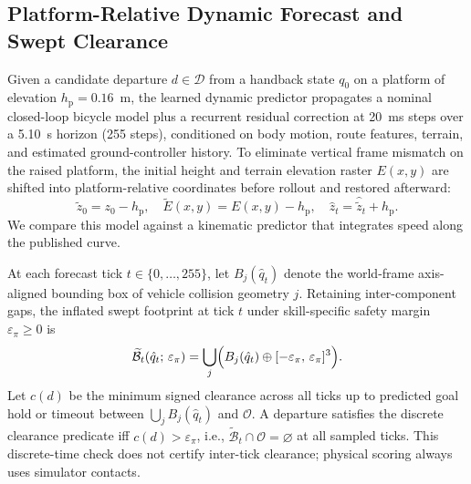\documentclass[letterpaper,10pt,conference]{ieeeconf}
\begin{document}
\subsection{Platform-Relative Dynamic Forecast and Swept Clearance}
Given a candidate departure $d\in\mathcal{D}$ from a handback state $q_0$ on a platform of elevation $h_{\mathrm{p}}=0.16$~m, the learned dynamic predictor propagates a nominal closed-loop bicycle model plus a recurrent residual correction at 20~ms steps over a 5.10~s horizon (255 steps), conditioned on body motion, route features, terrain, and estimated ground-controller history. To eliminate vertical frame mismatch on the raised platform, the initial height and terrain elevation raster $E(x,y)$ are shifted into platform-relative coordinates before rollout and restored afterward:
\begin{equation}
  \tilde{z}_0 = z_0 - h_{\mathrm{p}},\quad
  \tilde{E}(x,y) = E(x,y) - h_{\mathrm{p}},\quad
  \hat{z}_t = \hat{\tilde{z}}_t + h_{\mathrm{p}}.
  \label{eq:relz}
\end{equation}
We compare this model against a kinematic predictor that integrates speed along the published curve.

At each forecast tick $t\in\{0,\dots,255\}$, let $B_j(\hat{q}_t)$ denote the world-frame axis-aligned bounding box of vehicle collision geometry $j$. Retaining inter-component gaps, the inflated swept footprint at tick $t$ under skill-specific safety margin $\varepsilon_\pi\ge 0$ is
\begin{equation}
  \widetilde{\mathcal{B}}_t(\hat{q}_t;\,\varepsilon_\pi)
  = \bigcup_{j}\Bigl(B_j(\hat{q}_t)\oplus[-\varepsilon_\pi,\,\varepsilon_\pi]^3\Bigr).
  \label{eq:footprint}
\end{equation}
Let $c(d)$ be the minimum signed clearance across all ticks up to predicted goal hold or timeout between $\bigcup_j B_j(\hat{q}_t)$ and $\mathcal{O}$. A departure satisfies the discrete clearance predicate iff $c(d)>\varepsilon_\pi$, i.e., $\widetilde{\mathcal{B}}_t\cap\mathcal{O}=\varnothing$ at all sampled ticks. This discrete-time check does not certify inter-tick clearance; physical scoring always uses simulator contacts.
\end{document}
